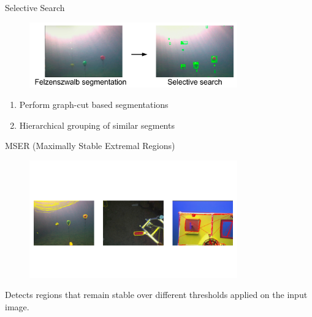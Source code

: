 \documentclass[14pt]{beamer}
\begin{document}
\begin{frame}{Selective Search}

  \begin{figure}[ht]
      \centering
      \includegraphics[width=0.8\textwidth, height=0.4\textwidth]{figs/selectivesearch.png}
  \end{figure}

  \begin{enumerate}
    \item Perform graph-cut based segmentations
    \item Hierarchical grouping of similar segments
  \end{enumerate}
\end{frame}

\begin{frame}{MSER (Maximally Stable Extremal Regions)}

  \begin{figure}[ht]
      \centering
      \includegraphics[width=0.8\textwidth, height=0.5\textwidth]{figs/mserproposal.png}
  \end{figure}

  {\small Detects regions that remain stable over different thresholds applied
    on the input image.}
\end{frame}
\end{document}
